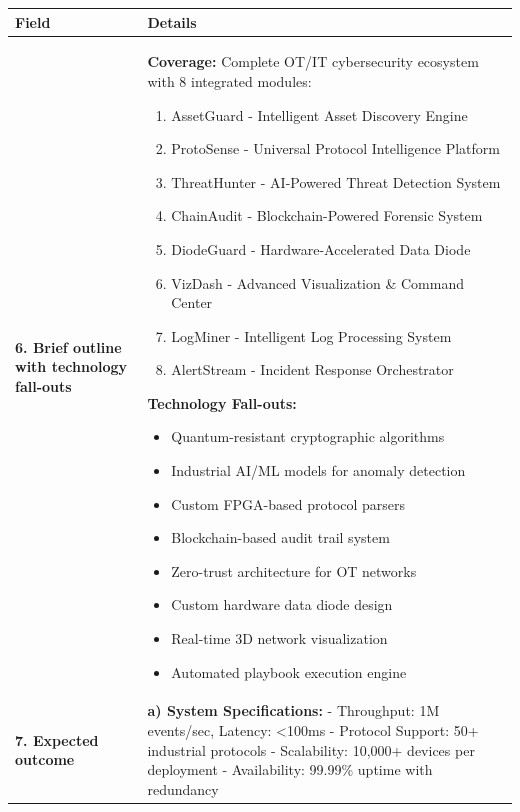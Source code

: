 \documentclass[12pt,a4paper]{article}
\begin{document}
\begin{longtable}{|p{3cm}|p{12cm}|}
\end{longtable}

\begin{longtable}{|p{3cm}|p{12cm}|}
\hline
\rowcolor{lightblue}
\textbf{Field} & \textbf{Details} \\
\hline
\endhead

\textbf{6. Brief outline with technology fall-outs} & 
\textbf{Coverage:} Complete OT/IT cybersecurity ecosystem with 8 integrated modules:
\begin{enumerate}[leftmargin=1em]
    \item AssetGuard - Intelligent Asset Discovery Engine
    \item ProtoSense - Universal Protocol Intelligence Platform  
    \item ThreatHunter - AI-Powered Threat Detection System
    \item ChainAudit - Blockchain-Powered Forensic System
    \item DiodeGuard - Hardware-Accelerated Data Diode
    \item VizDash - Advanced Visualization \& Command Center
    \item LogMiner - Intelligent Log Processing System
    \item AlertStream - Incident Response Orchestrator
\end{enumerate}

\textbf{Technology Fall-outs:}
\begin{itemize}[leftmargin=1em]
    \item Quantum-resistant cryptographic algorithms
    \item Industrial AI/ML models for anomaly detection
    \item Custom FPGA-based protocol parsers
    \item Blockchain-based audit trail system
    \item Zero-trust architecture for OT networks
    \item Custom hardware data diode design
    \item Real-time 3D network visualization
    \item Automated playbook execution engine
\end{itemize} \\
\hline

\multirow{3}{*}{\textbf{7. Expected outcome}} & 
\textbf{a) System Specifications:}
- Throughput: 1M events/sec, Latency: <100ms
- Protocol Support: 50+ industrial protocols
- Scalability: 10,000+ devices per deployment
- Availability: 99.99\% uptime with redundancy


\end{longtable}
\end{document}
